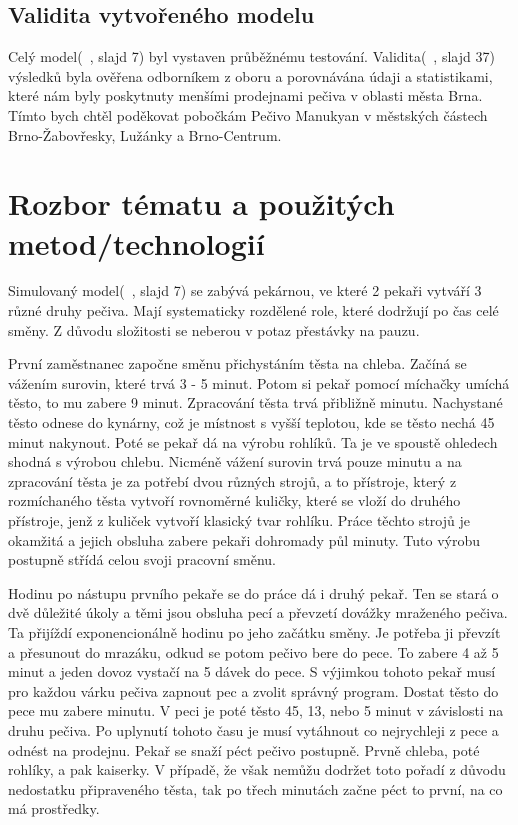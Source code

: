 \documentclass[11pt]{article}
\begin{document}
\subsection{Validita vytvořeného modelu}
Celý model(~\cite{prezentace}, slajd 7) byl vystaven průběžnému testování. Validita(~\cite{prezentace}, slajd 37) výsledků byla ověřena odborníkem z oboru a porovnávána údaji a statistikami, které nám byly poskytnuty menšími prodejnami pečiva v oblasti města Brna. Tímto bych chtěl poděkovat pobočkám Pečivo Manukyan v městských částech Brno-Žabovřesky, Lužánky a Brno-Centrum.


\section{Rozbor tématu a použitých metod/technologií}
Simulovaný model(~\cite{prezentace}, slajd 7) se zabývá pekárnou, ve které 2 pekaři vytváří 3 různé druhy pečiva. Mají systematicky rozdělené role, které dodržují po čas celé směny. Z důvodu složitosti se neberou v potaz přestávky na pauzu. 

První zaměstnanec započne směnu přichystáním těsta na chleba. Začíná se vážením surovin, které trvá 3 - 5 minut. Potom si pekař pomocí míchačky umíchá těsto, to mu zabere 9 minut. Zpracování těsta trvá přibližně minutu. Nachystané těsto odnese do kynárny, což je místnost s vyšší teplotou, kde se těsto nechá 45 minut nakynout. Poté se pekař dá na výrobu rohlíků. Ta je ve spoustě ohledech shodná s výrobou chlebu. Nicméně vážení surovin trvá pouze minutu a na zpracování těsta je za potřebí dvou různých strojů, a to přístroje, který z rozmíchaného těsta vytvoří rovnoměrné kuličky, které se vloží do druhého přístroje, jenž z kuliček vytvoří klasický tvar rohlíku. Práce těchto strojů je okamžitá a jejich obsluha zabere pekaři dohromady půl minuty. Tuto výrobu postupně střídá celou svoji pracovní směnu.

Hodinu po nástupu prvního pekaře se do práce dá i druhý pekař. Ten se stará o dvě důležité úkoly a těmi jsou obsluha pecí a převzetí dovážky mraženého pečiva. Ta přijíždí exponencionálně hodinu po jeho začátku směny. Je potřeba ji převzít a přesunout do mrazáku, odkud se potom pečivo bere do pece. To zabere 4 až 5 minut a jeden dovoz vystačí na 5 dávek do pece. S výjimkou tohoto pekař musí pro každou várku pečiva zapnout pec a zvolit správný program. Dostat těsto do pece mu zabere minutu. V peci je poté těsto 45, 13, nebo 5 minut v závislosti na druhu pečiva. Po uplynutí tohoto času je musí vytáhnout co nejrychleji z pece a odnést na prodejnu. Pekař se snaží péct pečivo postupně. Prvně chleba, poté rohlíky, a pak kaiserky. V případě, že však nemůžu dodržet toto pořadí z důvodu nedostatku připraveného těsta, tak po třech minutách začne péct to první, na co má prostředky.
\end{document}
